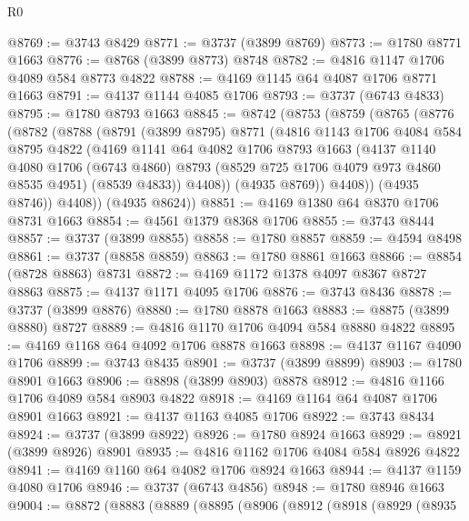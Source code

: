 \begin{lexlean}{R0}
\begin{coremodule}
@8769 := @3743 @8429
@8771 := @3737 (@3899 @8769)
@8773 := @1780 @8771 @1663
@8776 := @8768 (@3899 @8773) @8748
@8782 := @4816 @1147 @1706 @4089 @584 @8773 @4822
@8788 := @4169 @1145 @64 @4087 @1706 @8771 @1663
@8791 := @4137 @1144 @4085 @1706
@8793 := @3737 (@6743 @4833)
@8795 := @1780 @8793 @1663
@8845 := @8742
    (@8753
      (@8759
        (@8765
          (@8776
            (@8782
              (@8788
                (@8791
                  (@3899 @8795)
                  @8771
                  (@4816
                    @1143
                    @1706
                    @4084
                    @584
                    @8795
                    @4822
                    (@4169
                      @1141
                      @64
                      @4082
                      @1706
                      @8793
                      @1663
                      (@4137
                        @1140
                        @4080
                        @1706
                        (@6743 @4860)
                        @8793
                        (@8529 @725 @1706 @4079 @973 @4860 @8535 @4951)
                        (@8539 @4833))
                      @4408))
                  (@4935 @8769))
                @4408))
            (@4935 @8746))
          @4408))
      (@4935 @8624))
@8851 := @4169 @1380 @64 @8370 @1706 @8731 @1663
@8854 := @4561 @1379 @8368 @1706
@8855 := @3743 @8444
@8857 := @3737 (@3899 @8855)
@8858 := @1780 @8857
@8859 := @4594 @8498
@8861 := @3737 (@8858 @8859)
@8863 := @1780 @8861 @1663
@8866 := @8854 (@8728 @8863) @8731
@8872 := @4169 @1172 @1378 @4097 @8367 @8727 @8863
@8875 := @4137 @1171 @4095 @1706
@8876 := @3743 @8436
@8878 := @3737 (@3899 @8876)
@8880 := @1780 @8878 @1663
@8883 := @8875 (@3899 @8880) @8727
@8889 := @4816 @1170 @1706 @4094 @584 @8880 @4822
@8895 := @4169 @1168 @64 @4092 @1706 @8878 @1663
@8898 := @4137 @1167 @4090 @1706
@8899 := @3743 @8435
@8901 := @3737 (@3899 @8899)
@8903 := @1780 @8901 @1663
@8906 := @8898 (@3899 @8903) @8878
@8912 := @4816 @1166 @1706 @4089 @584 @8903 @4822
@8918 := @4169 @1164 @64 @4087 @1706 @8901 @1663
@8921 := @4137 @1163 @4085 @1706
@8922 := @3743 @8434
@8924 := @3737 (@3899 @8922)
@8926 := @1780 @8924 @1663
@8929 := @8921 (@3899 @8926) @8901
@8935 := @4816 @1162 @1706 @4084 @584 @8926 @4822
@8941 := @4169 @1160 @64 @4082 @1706 @8924 @1663
@8944 := @4137 @1159 @4080 @1706
@8946 := @3737 (@6743 @4856)
@8948 := @1780 @8946 @1663
@9004 := @8872
    (@8883
      (@8889
        (@8895
          (@8906
            (@8912
              (@8918
                (@8929
                  (@8935

\end{coremodule}
\end{lexlean}
